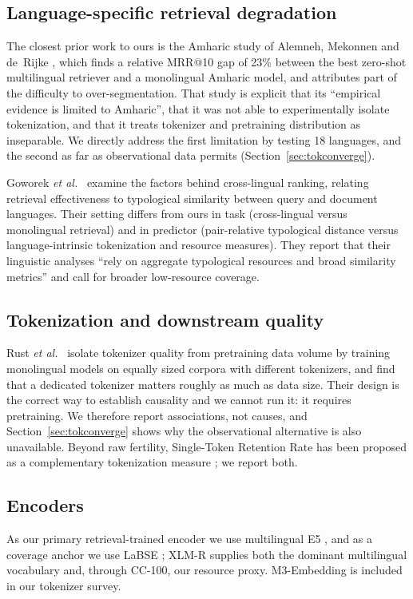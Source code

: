 \documentclass{ijimai_article}
\begin{document}
\subsection{Language-specific retrieval degradation}
The closest prior work to ours is the Amharic study of Alemneh, Mekonnen and
de~Rijke \cite{alemneh2026}, which finds a relative MRR@10 gap of 23\% between the
best zero-shot multilingual retriever and a monolingual Amharic model, and attributes
part of the difficulty to over-segmentation. That study is explicit that its
``empirical evidence is limited to Amharic'', that it was not able to experimentally
isolate tokenization, and that it treats tokenizer and pretraining distribution as
inseparable. We directly address the first limitation by testing 18 languages, and the
second as far as observational data permits (Section~\ref{sec:tokconverge}).

Goworek \emph{et al.}~\cite{goworek2025} examine the factors behind cross-lingual
ranking, relating retrieval effectiveness to typological similarity between query and
document languages. Their setting differs from ours in task (cross-lingual versus
monolingual retrieval) and in predictor (pair-relative typological distance versus
language-intrinsic tokenization and resource measures). They report that their
linguistic analyses ``rely on aggregate typological resources and broad similarity
metrics'' and call for broader low-resource coverage.

\subsection{Tokenization and downstream quality}
Rust \emph{et al.}~\cite{rust2021} isolate tokenizer quality from pretraining data
volume by training monolingual models on equally sized corpora with different
tokenizers, and find that a dedicated tokenizer matters roughly as much as data size.
Their design is the correct way to establish causality and we cannot run it: it
requires pretraining. We therefore report associations, not causes, and
Section~\ref{sec:tokconverge} shows why the observational alternative is also
unavailable. Beyond raw fertility, Single-Token Retention Rate has been proposed as a
complementary tokenization measure \cite{nayeem2025}; we report both.

\subsection{Encoders}
As our primary retrieval-trained encoder we use multilingual E5 \cite{wang2024}, and as
a coverage anchor we use LaBSE \cite{feng2022}; XLM-R \cite{conneau2020} supplies both
the dominant multilingual vocabulary and, through CC-100, our resource proxy.
M3-Embedding \cite{chen2024} is included in our tokenizer survey.
\end{document}

